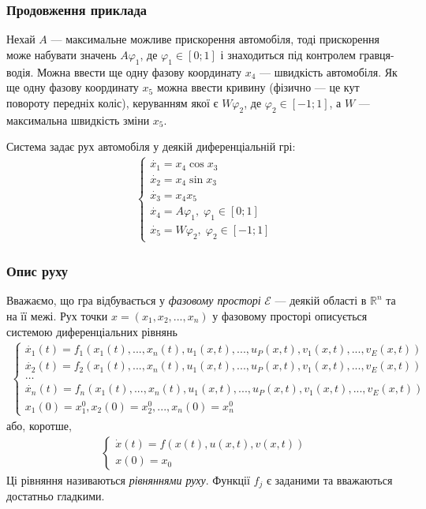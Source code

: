 \documentclass[10pt,pdf,aspectratio=169]{beamer}
\newcommand{\R}{\mathbb{R}}
\newcommand{\vf}{\varphi}
\renewcommand{\d}[1]{\dot{#1}}
\newcommand{\E}{\mathcal{E}}
\renewcommand{\l}{\left}
\renewcommand{\r}{\right}
\begin{document}
    \begin{frame}
        \frametitle{Продовження приклада}

        Нехай $A$ --- максимальне можливе прискорення автомобіля, тоді прискорення може набувати значень
        $A \vf_1$, де $\vf_1 \in [0; 1]$ і знаходиться під контролем гравця-водія. Можна ввести ще одну фазову координату $x_4$ --- швидкість автомобіля.
        Як ще одну фазову координату $x_5$ можна ввести кривину
        (фізично --- це кут повороту передніх коліс), керуванням якої є $W \vf_2$, де $\vf_2 \in [-1; 1]$, а $W$ --- максимальна швидкість зміни $x_5$.

        Система задає рух автомобіля у деякій диференціальній грі:
        \begin{gather*}
            \begin{cases}
                \d{x_1} = x_4 \cos{x_3} \\
                \d{x_2} = x_4 \sin{x_3} \\
                \d{x_3} = x_4 x_5 \\
                \d{x_4} = A \vf_1, \; \vf_1 \in [0; 1] \\
                \d{x_5} = W \vf_2, \; \vf_2 \in [-1; 1]
            \end{cases}
        \end{gather*}
    \end{frame}
    \begin{frame}
        \frametitle{Опис руху}
    
        Вважаємо, що гра відбувається у \emph{фазовому просторі} $\E$ --- деякій області в $\R^n$ та на її межі.
        Рух точки $x = \l(x_1, x_2, ..., x_n \r)$ у фазовому просторі описується системою диференціальних рівнянь
        \begin{gather*}\label{eq_1}
            \begin{cases}
                \d{x_1}(t) = f_1(x_1(t), ..., x_n(t), u_1(x, t), ..., u_P(x, t), v_1(x, t), ..., v_E(x, t)) \\
                \d{x_2}(t) = f_2(x_1(t), ..., x_n(t), u_1(x, t), ..., u_P(x, t), v_1(x, t), ..., v_E(x, t)) \\
                \dots \\
                \d{x_n}(t) = f_n(x_1(t), ..., x_n(t), u_1(x, t), ..., u_P(x, t), v_1(x, t), ..., v_E(x, t)) \\
                x_1(0) = x_1^0, x_2(0) = x_2^0, ..., x_n(0) = x_n^0
            \end{cases}
        \end{gather*}
        або, коротше,
        \begin{gather*}\label{eq_2}
            \begin{cases}
                \d{x}(t) = {f}(x(t), u(x, t), v(x, t)) \\
                x(0) = x_0
            \end{cases}
        \end{gather*}
        Ці рівняння називаються \emph{рівняннями руху}. Функції $f_j$ є заданими та вважаються достатньо гладкими.
    \end{frame}
\end{document}
